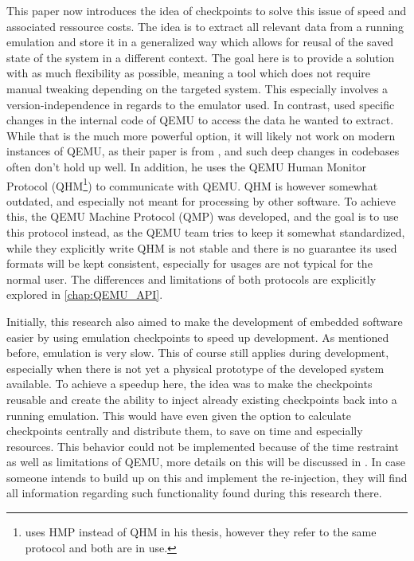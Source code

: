 This paper now introduces the idea of checkpoints to solve this issue of speed and associated ressource costs.
The idea is to extract all relevant data from a running emulation
and store it in a generalized way which allows for reusal of the saved state of the system in a different context.
The goal here is to provide a solution with as much flexibility as possible,
meaning a tool which does not require manual tweaking depending on the targeted system.
This especially involves a version-independence in regards to the emulator used.
In contrast,  used specific changes in the internal code of QEMU
to access the data he wanted to extract.
While that is the much more powerful option, it will likely not work on modern instances of QEMU,
as their paper is from \citeyear{kitcheckpoints}, and such deep changes in codebases often don't hold up well.
In addition, he uses the QEMU Human Monitor Protocol (QHM\footnote{ uses HMP instead of QHM in his thesis, however they refer to the same protocol and both are in use.}) to communicate with QEMU.
QHM is however somewhat outdated, and especially not meant for processing by other software.
To achieve this, the QEMU Machine Protocol (QMP) was developed, and the goal is to use this protocol instead,
as the QEMU team tries to keep it somewhat standardized,
while they explicitly write QHM is not stable and there is no guarantee its used formats will be kept consistent,
especially for usages are not typical for the normal user.
The differences and limitations of both protocols are explicitly explored in \autoref{chap:QEMU_API}.

Initially, this research also aimed to make the development of embedded software easier by using emulation checkpoints to speed up development.
As mentioned before, emulation is very slow.
This of course still applies during development, especially when there is not yet a physical prototype of the developed system available.
To achieve a speedup here, the idea was to make the checkpoints reusable
and create the ability to inject already existing checkpoints back into a running emulation.
This would have even given the option to calculate checkpoints centrally and distribute them,
to save on time and especially resources.
This behavior could not be implemented because of the time restraint as well as limitations of QEMU,
more details on this will be discussed in .
In case someone intends to build up on this and implement the re-injection,
they will find all information regarding such functionality found during this research there.